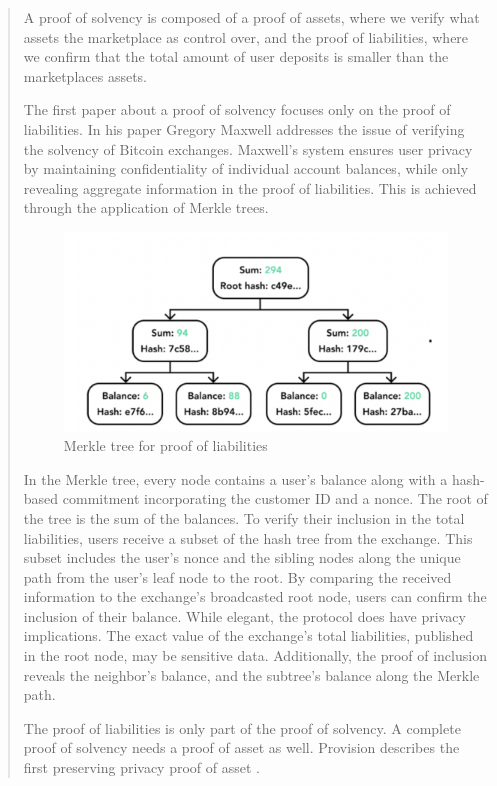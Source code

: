 \begin{quote}
A proof of solvency is composed of a proof of assets, where we verify what assets the marketplace as control over, and the proof of liabilities,
where we confirm that the total amount of user deposits is smaller than the marketplaces assets.

The first paper about a proof of solvency focuses only on the proof of liabilities. In his paper Gregory Maxwell addresses the issue of verifying
the solvency of Bitcoin exchanges. \cite{chainlink_blog}
Maxwell's system ensures user privacy by maintaining confidentiality of individual account balances, while only revealing aggregate information in the proof of liabilities.
This is achieved through the application of Merkle trees.


\begin{figure}[H]
   \centering
   \includegraphics[width=130mm]{MerkleTreeLiabilities.png}
   \caption{Merkle tree for proof of liabilities}
   \label{overflow}
   \end{figure}


In the Merkle tree, every node contains a user's balance along with a hash-based commitment incorporating the customer ID and a nonce. The root of the tree is the sum of the balances.
To verify their inclusion in the total liabilities, users receive a subset of the hash tree from the exchange. This subset includes the user's nonce and the sibling nodes along the unique path from the user's leaf node to the root.
By comparing the received information to the exchange's broadcasted root node, users can confirm the inclusion of their balance.
While elegant, the protocol does have privacy implications. The exact value of the exchange's total liabilities, published in the root node, may be sensitive data.
Additionally, the proof of inclusion reveals the neighbor's balance, and the subtree's balance along the Merkle path.

The proof of liabilities is only part of the proof of solvency. A complete proof of solvency needs a proof of asset as well.
Provision describes the first preserving privacy proof of asset \cite{DBBBCC15}.


\end{quote}
